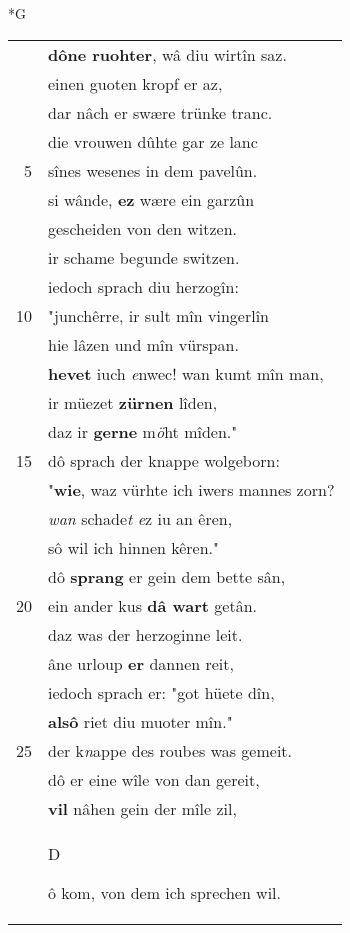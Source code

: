 \documentclass[8pt,a4paper,notitlepage]{article}
\begin{document}
\begin{table}[ht]
\begin{minipage}[t]{0.5\linewidth}
\small
\begin{center}*G
\end{center}
\begin{tabular}{rl}
 & \textbf{dône ruohter}, wâ diu wirtîn saz.\\ 
 & einen guoten kropf er az,\\ 
 & dar nâch er swære trünke tranc.\\ 
 & die vrouwen dûhte gar ze lanc\\ 
5 & sînes wesenes in dem pavelûn.\\ 
 & si wânde, \textbf{ez} wære ein garzûn\\ 
 & gescheiden von den witzen.\\ 
 & ir schame begunde switzen.\\ 
 & iedoch sprach diu herzogîn:\\ 
10 & "junchêrre, ir sult mîn vingerlîn\\ 
 & hie lâzen und mîn vürspan.\\ 
 & \textbf{hevet} iuch \textit{e}nwec! wan kumt mîn man,\\ 
 & ir müezet \textbf{zürnen} lîden,\\ 
 & daz ir \textbf{gerne} m\textit{ö}ht mîden."\\ 
15 & dô sprach der knappe wolgeborn:\\ 
 & "\textbf{wie}, waz vürhte ich iwers mannes zorn?\\ 
 & \textit{wan }schade\textit{t} \textit{e}z iu an êren,\\ 
 & sô wil ich hinnen kêren."\\ 
 & dô \textbf{sprang} er gein dem bette sân,\\ 
20 & ein ander kus \textbf{dâ wart} getân.\\ 
 & daz was der herzoginne leit.\\ 
 & âne urloup \textbf{er} dannen reit,\\ 
 & iedoch sprach er: "got hüete dîn,\\ 
 & \textbf{alsô} riet diu muoter mîn."\\ 
25 & der k\textit{n}appe des roubes was gemeit.\\ 
 & dô er eine wîle von dan gereit,\\ 
 & \textbf{vil} nâhen gein der mîle zil,\\ 
 & \begin{large}D\end{large}ô kom, von dem ich sprechen wil.\\ 

\end{tabular}
\end{minipage}
\end{table}
\end{document}
